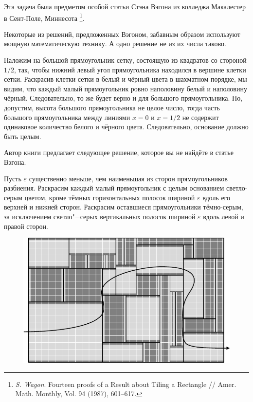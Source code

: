 \documentclass[twoside]{book}
\begin{document}
Эта задача была предметом особой 
статьи Стэна Вэгона из колледжа Макалестер в Сент-Поле, Миннесота%
\footnote{\emph{S. Wagon}. Fourteen proofs of a Result about Tiling a Rectangle /\!/ {Amer. Math. Monthly}, Vol. 94 (1987), 601--617.}.

Некоторые из решений, предложенных Вэгоном, забавным образом используют мощную математическую технику.
А одно решение не из их числа таково.

\medskip

Наложим на большой прямоугольник сетку, состоящую из квадратов со стороной $1/2$, так, чтобы нижний левый угол прямоугольника находился в вершине клетки сетки.
Раскрасив клетки сетки в белый и чёрный цвета в шахматном порядке, 
мы видим, что каждый малый прямоугольник ровно наполовину белый и наполовину чёрный.
Следовательно, то же будет верно и для большого прямоугольника.
Но, допустим, высота большого прямоугольника не целое число, тогда часть 
большого прямоугольника между линиями $x=0$ и $x=1/2$ не содержит одинаковое количество белого и чёрного цвета.
Следовательно, основание должно быть целым.\heart

Автор книги предлагает следующее решение, которое вы не найдёте в статье Вэгона.

Пусть $\varepsilon$ существенно меньше, чем наименьшая из сторон прямоугольников разбиения.
Раскрасим каждый малый прямоугольник с целым основанием светло-серым цветом, кроме тёмных горизонтальных полосок шириной $\varepsilon$ вдоль его верхней и нижней сторон.
Раскрасим оставшиеся прямоугольники тёмно-серым, за исключением светло"=серых вертикальных полосок шириной $\varepsilon$ вдоль левой и правой сторон.

\begin{figure}[!ht]
\centering
\includegraphics[scale=.95]{mp/wink-2}
\end{figure}
\end{document}
